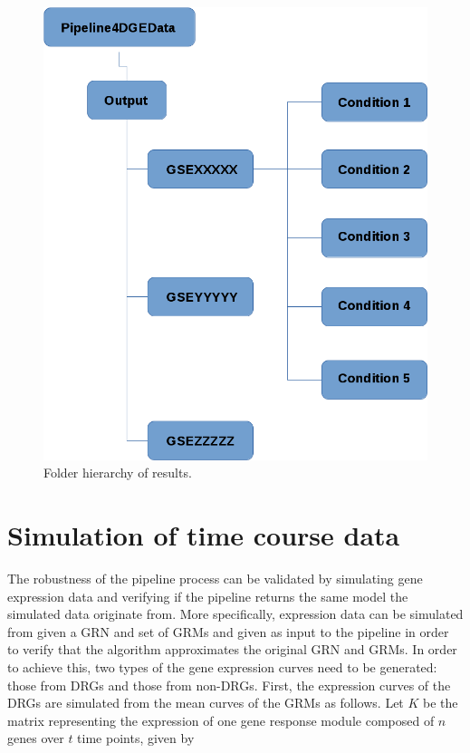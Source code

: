 \documentclass[final,letterpaper,12pt]{article}
\begin{document}
\begin{figure}
	\centering
	\includegraphics[width=\textwidth]{FolderHierarchy1}
	\caption{Folder hierarchy of results.}
	\label{fig:results_hierarchy_1}
\end{figure}


\section{Simulation of time course data}
\label{section:simulation}

\par The robustness of the pipeline process can be validated by simulating gene expression data and verifying if the pipeline returns the same model the simulated data originate from. More specifically, expression data can be simulated from given a GRN and set of GRMs and given as input to the pipeline in order to verify that the algorithm approximates the original GRN and GRMs. In order to achieve this, two types of the gene expression curves need to be generated: those from DRGs and those from non-DRGs. First, the expression curves of the DRGs are simulated from the mean curves of the GRMs as follows. Let $K$ be the matrix representing the expression of one gene response module composed of $n$ genes over $t$ time points, given by
\end{document}
